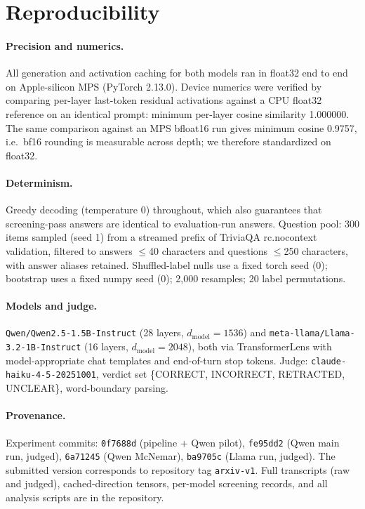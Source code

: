 \documentclass[11pt]{article}
\begin{document}
\section{Reproducibility}
\label{app:repro}
\paragraph{Precision and numerics.} All generation and activation
caching for both models ran in float32 end to end on Apple-silicon MPS
(PyTorch 2.13.0). Device numerics were verified by comparing per-layer
last-token residual activations against a CPU float32 reference on an
identical prompt: minimum per-layer cosine similarity 1.000000. The
same comparison against an MPS bfloat16 run gives minimum cosine
0.9757, i.e.\ bf16 rounding is measurable across depth; we therefore
standardized on float32.

\paragraph{Determinism.} Greedy decoding (temperature 0) throughout,
which also guarantees that screening-pass answers are identical to
evaluation-run answers. Question pool: 300 items sampled (seed 1) from
a streamed prefix of TriviaQA rc.nocontext validation, filtered to
answers $\leq$40 characters and questions $\leq$250 characters, with
answer aliases retained. Shuffled-label nulls use a fixed torch seed
(0); bootstrap uses a fixed numpy seed (0); 2{,}000 resamples; 20 label
permutations.

\paragraph{Models and judge.} \texttt{Qwen/Qwen2.5-1.5B-Instruct}
(28 layers, $d_{\text{model}}{=}1536$) and
\texttt{meta-llama/\allowbreak Llama-3.2-1B-Instruct} (16 layers,
$d_{\text{model}}{=}2048$), both via TransformerLens with
model-appropriate chat templates and end-of-turn stop tokens. Judge:
\texttt{claude-haiku-4-5-20251001}, verdict set
\{CORRECT, INCORRECT, RETRACTED, UNCLEAR\}, word-boundary parsing.

\paragraph{Provenance.} Experiment commits: \texttt{0f7688d} (pipeline
+ Qwen pilot), \texttt{fe95dd2} (Qwen main run, judged),
\texttt{6a71245} (Qwen McNemar), \texttt{ba9705c} (Llama run, judged).
The submitted version corresponds to repository tag
\texttt{arxiv-v1}. Full transcripts (raw and judged), cached-direction
tensors, per-model screening records, and all analysis scripts are in
the repository.



\end{document}
